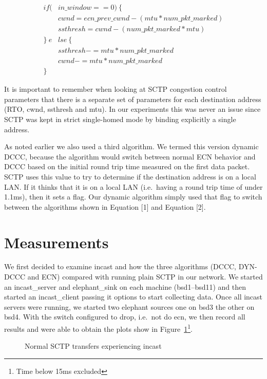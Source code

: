 \documentclass[12pt]{article}
\begin{document}
\begin{equation}
\begin{split}
if (&in\_window == 0)~\{ \\
&cwnd = ecn\_prev\_cwnd - (mtu * num\_pkt\_marked) \\
&ssthresh = cwnd - (num\_pkt\_marked * mtu) \\
\}~e&lse~\{\\
&ssthresh -= mtu * num\_pkt\_marked \\
&cwnd -= mtu * num\_pkt\_marked\\
\}~~&
\end{split}
\end{equation}

It is important to remember when looking at SCTP congestion control
parameters that there
is a separate set of parameters for each destination address (RTO, cwnd, ssthresh and mtu). In
our experiments this was never an issue since SCTP was kept in strict single-homed mode
by binding explicitly a single address. 

As noted earlier we also used a third algorithm. We termed this version dynamic DCCC, because the algorithm would switch between normal ECN behavior and DCCC based on the
initial round trip time measured on the first data packet. SCTP uses this value to try to determine
if the destination address is on a local LAN. If it thinks that it is on a local LAN (i.e.~having a round
trip time of under 1.1ms), then it sets a flag. Our dynamic algorithm simply used
that flag to switch between the algorithms shown in Equation [1] and Equation [2].

\section{Measurements}
\label{measure}
We first decided to examine incast and how the three algorithms (DCCC, DYN-DCCC and ECN) compared with
running plain SCTP in our network. We started an incast\_server and elephant\_sink on each machine (bsd1--bsd11) and then 
started an incast\_client passing it options to start collecting data. Once all incast servers were running, we started two elephant sources one on bsd3 the other on bsd4. With the switch configured to drop, i.e.~not do ecn, we
then record all results and were able to obtain the plots show in Figure~\ref{fig:noEcnIncast}\footnote{Time below 15ms excluded}.
\begin{figure}[h]
\centering
{}
\caption{Normal SCTP transfers experiencing incast}
\label{fig:noEcnIncast}
\end{figure}
\end{document}
